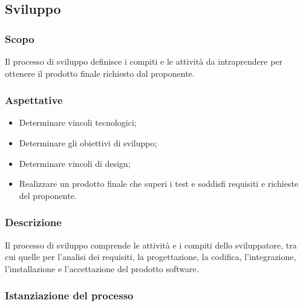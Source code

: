 \subsection{Sviluppo}
\subsubsection{Scopo}
Il processo di sviluppo definisce i compiti e le attività da intraprendere per ottenere il prodotto finale richiesto dal proponente.
\subsubsection{Aspettative}
\begin{itemize}
\item Determinare vincoli tecnologici;
\item Determinare gli obiettivi di sviluppo;
\item Determinare vincoli di design;
\item Realizzare un prodotto finale che superi i test e soddisfi requisiti e richieste del proponente.
\end{itemize}
\subsubsection{Descrizione}
Il processo di sviluppo comprende le attività e i compiti dello sviluppatore, tra cui quelle per l'analisi dei requisiti, la progettazione, la codifica, l'integrazione, l'installazione e l'accettazione del prodotto software.

\subsubsection{Istanziazione del processo}

